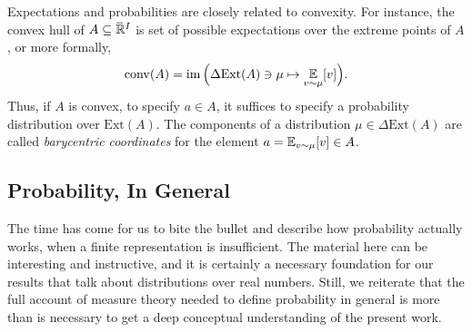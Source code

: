 Expectations and probabilities are closely related to convexity. 
For instance, 
the convex hull of $A \subseteq \mskip1mu\overline{\mskip-1mu\mathbb R\!}\,^I$ 
is set of possible expectations over the extreme points of $A$,
or more formally,
\[
    \mathrm{conv}(A) = \operatorname{\mathrm{im}} 
        \Big( \Delta \mathrm{Ext}(A) \ni \mu \mapsto \operatorname*{\mathbb{E}}_{v \sim \mu} [ v ] \Big).
\]
Thus, if $A$ is convex, to specify $a \in A$, it suffices to specify a probability distribution over $\mathrm{Ext}(A)$.  
The components of a distribution $\mu \in \Delta \mathrm{Ext}(A)$ are called \emph{barycentric coordinates} for the element $a = \operatorname*{\mathbb{E}}_{v \sim \mu}[v] \in A$.
%



% 

%

\subsection{Probability, In General}
    \label{ssec:gen-prob}

The time has come for us to bite the bullet and describe how probability actually works, when a finite representation is insufficient. 
The material here can be interesting and instructive,
    and it is certainly a necessary foundation for our results that talk about distributions over real numbers.
Still, we reiterate that the full account of measure theory needed to define probability in general is more than is necessary to get a deep conceptual understanding of the present work. 

